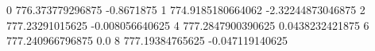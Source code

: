 0 776.373779296875 -0.8671875
1 774.9185180664062 -2.32244873046875
2 777.23291015625 -0.008056640625
4 777.2847900390625 0.0438232421875
6 777.240966796875 0.0
8 777.19384765625 -0.047119140625
